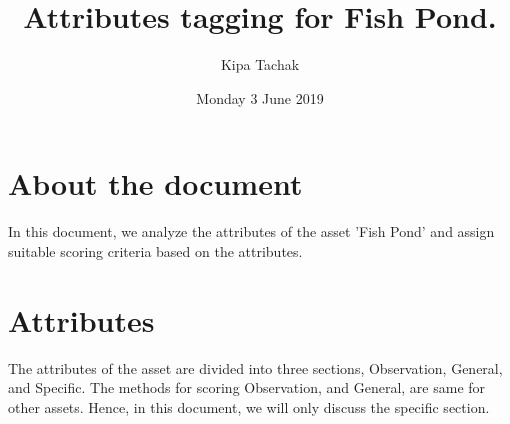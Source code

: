 \documentclass[oneside,twocolumn]{article}
\title{Attributes tagging for Fish Pond.}
\author{Kipa Tachak}
\date{Monday  3 June 2019}
\begin{document}
\maketitle

\section{About the document}
In this document, we analyze the attributes of the asset 'Fish Pond' and assign suitable scoring criteria based on the attributes.
\section{Attributes}
The attributes of the asset are divided into three sections, Observation,
General, and Specific. The methods for scoring Observation, and General,
are same for other assets. Hence, in this document, we will only discuss
the specific section.
\end{document}
